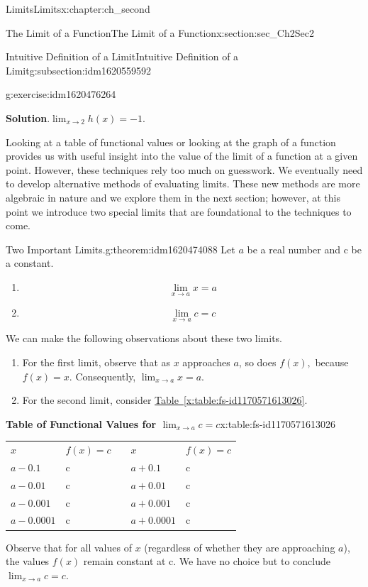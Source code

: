 \documentclass[oneside,10pt,]{book}
\newcommand{\blocktitlefont}{\relax}
\newcommand{\tabularfont}{\relax}
\newcommand{\xreffont}{\relax}
\numberwithin{equation}{section}
\begin{document}
\begin{chapterptx}{Limits}{}{Limits}{}{}{x:chapter:ch_second}
\begin{sectionptx}{The Limit of a Function}{}{The Limit of a Function}{}{}{x:section:sec_Ch2Sec2}
\begin{subsectionptx}{Intuitive Definition of a Limit}{}{Intuitive Definition of a Limit}{}{}{g:subsection:idm1620559592}
\begin{inlineexercise}{}{g:exercise:idm1620476264}
\par\smallskip%
\noindent\textbf{\blocktitlefont Solution}.\hypertarget{g:solution:idm1620473064}{}\quad{}\(\lim_{x\to2}h(x)=-1.\)%
\end{inlineexercise}%
Looking at a table of functional values or looking at the graph of a function provides us with useful insight into the value of the limit of a function at a given point. However, these techniques rely too much on guesswork. We eventually need to develop alternative methods of evaluating limits. These new methods are more algebraic in nature and we explore them in the next section; however, at this point we introduce two special limits that are foundational to the techniques to come.%
\begin{theorem}{Two Important Limits.}{}{g:theorem:idm1620474088}%
Let \(a \) be a real number and c be a constant.%
%
\begin{enumerate}
\item{}%
\begin{equation*}
\lim_{x \to a} x=a
\end{equation*}
%
\item{}%
\begin{equation*}
\lim_{x \to a} c=c
\end{equation*}
%
\end{enumerate}
\end{theorem}
We can make the following observations about these two limits.%
%
\begin{enumerate}
\item{}For the first limit, observe that as \(x\) approaches \(a \), so does \(f(x),\) because \(f(x)=x.\) Consequently, \(\lim_{x \to a} x=a.\)%
\item{}For the second limit, consider \hyperref[x:table:fs-id1170571613026]{Table~{\xreffont\ref{x:table:fs-id1170571613026}}}.%
\end{enumerate}
\begin{tableptx}{\textbf{Table of Functional Values for \(\lim_{x \to a} c=c\)}}{x:table:fs-id1170571613026}{}%
\centering%
{\tabularfont%
\begin{tabular}{lllll}
\textbf{\(x\)}&\textbf{\(f(x)=c\)}&\textbf{}&\textbf{\(x\)}&\textbf{\(f(x)=c\)}\tabularnewline[0pt]
\(a-0.1\)&c&&\(a+0.1\)&c\tabularnewline[0pt]
\(a-0.01\)&c&&\(a+0.01\)&c\tabularnewline[0pt]
\(a-0.001\)&c&&\(a+0.001\)&c\tabularnewline[0pt]
\(a-0.0001\)&c&&\(a+0.0001\)&c
\end{tabular}
}%
\end{tableptx}%
Observe that for all values of \(x\) (regardless of whether they are approaching \(a \)), the values \(f(x)\) remain constant at c. We have no choice but to conclude \(\lim_{x \to a} c=c.\)%

\end{subsectionptx}
\end{sectionptx}
\end{chapterptx}
\end{document}
